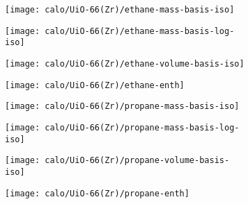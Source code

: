 \begin{figure}[H]

    \begin{subfigure}{0.25\textwidth}
        \texttt{[image: calo/UiO-66(Zr)/ethane-mass-basis-iso]}%
        \label{appx:fig:shaping:uio66c2h6mass}
    \end{subfigure}%
    \begin{subfigure}{0.25\textwidth}
        \texttt{[image: calo/UiO-66(Zr)/ethane-mass-basis-log-iso]}%
        \label{appx:fig:shaping:uio66c2h6masslog}
    \end{subfigure}%
    \begin{subfigure}{0.25\textwidth}
        \texttt{[image: calo/UiO-66(Zr)/ethane-volume-basis-iso]}%
        \label{appx:fig:shaping:uio66c2h6volume}
    \end{subfigure}%
    \begin{subfigure}{0.25\textwidth}
        \texttt{[image: calo/UiO-66(Zr)/ethane-enth]}%
        \label{appx:fig:shaping:uio66c2h6enth}%
    \end{subfigure}%

    \begin{subfigure}{0.25\textwidth}
        \texttt{[image: calo/UiO-66(Zr)/propane-mass-basis-iso]}%
        \label{appx:fig:shaping:uio66c3h8mass}
    \end{subfigure}%
    \begin{subfigure}{0.25\textwidth}
        \texttt{[image: calo/UiO-66(Zr)/propane-mass-basis-log-iso]}%
        \label{appx:fig:shaping:uio66c3h8masslog}
    \end{subfigure}%
    \begin{subfigure}{0.25\textwidth}
        \texttt{[image: calo/UiO-66(Zr)/propane-volume-basis-iso]}%
        \label{appx:fig:shaping:uio66c3h8volume}
    \end{subfigure}%
    \begin{subfigure}{0.25\textwidth}
        \texttt{[image: calo/UiO-66(Zr)/propane-enth]}%
        \label{appx:fig:shaping:uio66c3h8enth}%
    \end{subfigure}%


\end{figure}
